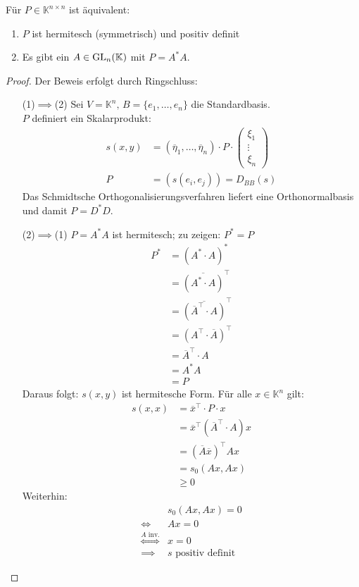 \documentclass[parskip,a4paper,twoside,DIV15,BCOR12mm]{scrbook}
\begin{document}
\begin{theo}
\label{Satz 17.2}
Für \(P\in\mathbb{K}^{n\times n}\) ist äquivalent:
\begin{enumerate}
\item \(P\) ist hermitesch (symmetrisch) und positiv definit
\item Es gibt ein \(A\in\operatorname{GL}_{n}(\mathbb{K})\) mit \(P=A^{*}A\).
\end{enumerate}
\end{theo}
\begin{proof}
Der Beweis erfolgt durch Ringschluss:
\begin{enumerate}
\item[(1)$\implies$(2)]
Sei \(V=\mathbb{K}^{n},\,B=\{e_{1},\ldots,e_{n}\}\) die Standardbasis.\\
\(P\) definiert ein Skalarprodukt:
\begin{align*}
s(x,y)&=(\overline{\eta}_{1},\ldots,\overline{\eta}_{n})\cdot P\cdot
    \begin{pmatrix}\xi_{1}\\\vdots\\\xi_{n}\end{pmatrix}\\
P&=\left(s(e_{i},e_{j})\right)=D_{BB}(s)
\end{align*}
Das Schmidtsche Orthogonalisierungsverfahren liefert eine Orthonormalbasis und
damit \(P=D^{*}D\).
\item[(2)$\implies$(1)]
\(P=A^{*}A\) ist hermitesch; zu zeigen: \(P^{*}=P\)
\begin{align*}
P^{*}&=\left(A^{*}\cdot A\right)^{*}\\
&=\overline{\left(A^{*}\cdot A\right)}^{\top}\\
&=\overline{\left(\overline{A}^{\top}\cdot A\right)}^{\top}\\
&=\left(A^{\top}\cdot\overline{A}\right)^{\top}\\
&=\overline{A}^{\top}\cdot A\\
&=A^{*}A\\
&=P
\end{align*}
Daraus folgt: \(s(x,y)\) ist hermitesche Form. Für alle \(x\in\mathbb{K}^{n}\)
gilt:
\begin{align*}
s(x,x)&=\overline{x}^{\top}\cdot P\cdot x\\
&=\overline{x}^{\top}\left(\overline{A}^{\top}\cdot A\right)x\\
&=\left(\overline{A}\overline{x}\right)^{\top}Ax\\
&=s_{0}(Ax,Ax)\\
&\geq0
\end{align*}
Weiterhin:
\begin{align*}
&s_{0}(Ax,Ax)=0\\
\Longleftrightarrow&Ax=0\\
\overset{A\text{ inv.}}{\Longleftrightarrow}&x=0\\
\implies&s\text{ positiv definit}
\end{align*}
\end{enumerate}
\end{proof}
\end{document}
